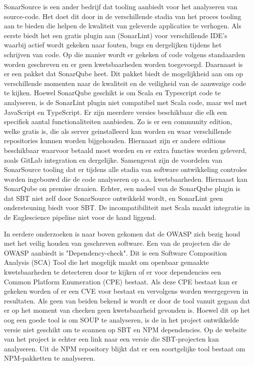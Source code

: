 \begin{itemize}
    SonarSource is een ander bedrijf dat tooling aanbiedt voor het analyseren van source-code. Het doet dit door in de verschillende stadia van het proces tooling aan te bieden die helpen de kwaliteit van geleverde applicaties te verhogen. Als eerste biedt het een gratis plugin aan (SonarLint) voor verschillende IDE's waarbij actief wordt gekeken naar fouten, bugs en dergelijken tijdens het schrijven van code. Op die manier wordt er gekeken of code volgens standaarden worden geschreven en er geen kwetsbaarheden worden toegevoegd. Daarnaast is er een pakket dat SonarQube heet. Dit pakket biedt de mogelijkheid aan om op verschillende momenten naar de kwaliteit en de veiligheid van de aanwezige code te kijken. Hoewel SonarQube geschikt is om Scala en Typescript code te analyseren, is de SonarLint plugin niet compatibel met Scala code, maar wel met JavaScript en TypeScript. Er zijn meerdere versies beschikbaar die elk een specifiek aantal functionaliteiten aanbieden. Zo is er een community edition, welke gratis is, die als server geinstalleerd kan worden en waar verschillende repositories kunnen worden bijgehouden. Hiernaast zijn er andere editions beschikbaar waarvoor betaald moet worden en er extra functies worden geleverd, zoals GitLab integration en dergelijke. Samengevat zijn de voordelen van SonarSource tooling dat er tijdens alle stadia van software ontwikkeling controles worden ingebouwd die de code analyseren op o.a. kwetsbaarheden. Hiernaast kan SonarQube on premise draaien. Echter, een nadeel van de SonarQube plugin is dat SBT niet zelf door SonarSource ontwikkeld wordt, en SonarLint geen ondersteuning biedt voor SBT. De incompatibiliteit met Scala maakt integratie in de Eaglescience pipeline niet voor de hand liggend.

    In eerdere onderzoeken is naar boven gekomen dat de OWASP zich bezig houd met het veilig houden van geschreven software. Een van de projecten die de OWASP aanbiedt is "Dependency-check". Dit is een Software Composition Analysis (SCA) Tool die het mogelijk maakt om openbaar gemaakte kwetsbaarheden te detecteren door te kijken of er voor dependencies een Common Platform Enumeration (CPE) bestaat. Als deze CPE bestaat kan er gekeken worden of er een CVE voor bestaat en vervolgens worden weergegeven in resultaten. Als geen van beiden bekend is wordt er door de tool vanuit gegaan dat er op het moment van checken geen kwetsbaarheid gevonden is. Hoewel dit op het oog een goede tool is om SOUP te analyseren, is de in het project ontwikkelde versie niet geschikt om te scannen op SBT en NPM dependencies. Op de website van het project is echter een link naar een versie die SBT-projecten kan analyseren. Uit de NPM repository blijkt dat er een soortgelijke tool bestaat om NPM-pakketten te analyseren.


\end{itemize}
